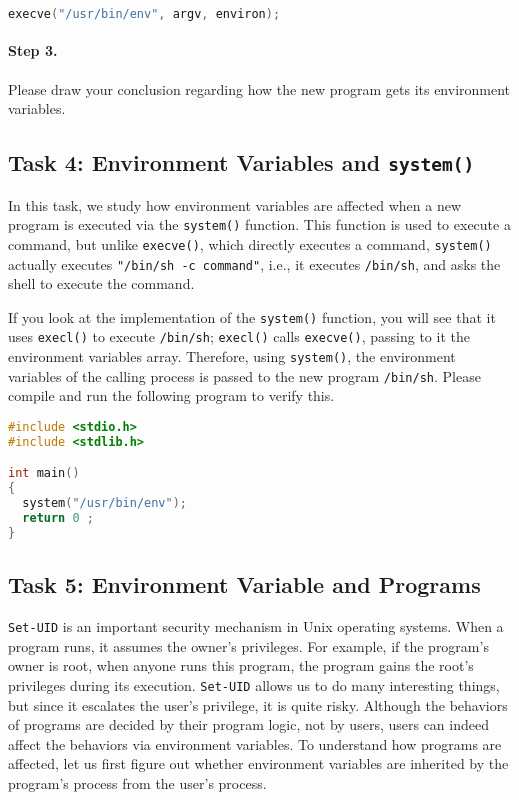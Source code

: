 \begin{lstlisting}[language=C]
execve("/usr/bin/env", argv, environ);
\end{lstlisting}


\paragraph{Step 3.} Please draw your conclusion regarding how the new
program gets its environment variables.



\subsection{Task 4: Environment Variables and {\tt system()}}

In this task, we study how environment variables are affected
when a new program is executed via the {\tt system()} function. This
function is used to execute a command, but unlike
{\tt execve()}, which directly executes a command, {\tt system()}
actually executes \texttt{"/bin/sh -c command"}, i.e., it
executes {\tt /bin/sh}, and asks the shell to execute the command.

If you look at the implementation of the {\tt system()} function, you will
see that it uses {\tt execl()} to execute {\tt /bin/sh}; {\tt execl()}
calls {\tt execve()}, passing to it the environment variables array.
Therefore, using {\tt system()}, the environment variables of the calling process
is passed to the new program {\tt /bin/sh}. Please compile and run the following program
to verify this.


\begin{lstlisting}[language=C]
#include <stdio.h>
#include <stdlib.h>

int main()
{
  system("/usr/bin/env");
  return 0 ;
}
\end{lstlisting}



\subsection{Task 5: Environment Variable and \setuid Programs}

{\tt Set-UID} is an important security mechanism in Unix operating systems.
When a \setuid program runs, it assumes the owner's privileges. For
example, if the program's owner is root, when anyone runs this
program, the program gains the root's privileges during its execution. 
{\tt Set-UID} allows us to do many interesting things, but since 
it escalates the user's privilege, it is quite risky. Although the
behaviors of \setuid programs are decided by their program logic, not by
users, users can indeed affect the behaviors via environment variables.
To understand how \setuid programs are affected, let us first figure out
whether environment variables are inherited by the \setuid program's
process from the user's process.


